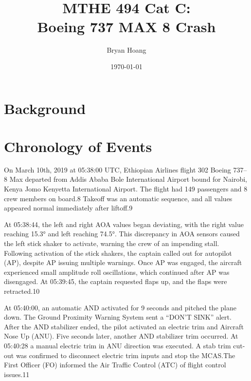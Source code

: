 \documentclass[
  10pt,
  promotesection,
  endnotes,
  draft,
]{memreport}
\title{
  MTHE 494 Cat C:\\
  Boeing 737 MAX 8 Crash
}
\author{Bryan Hoang}
\date{\today}
\begin{document}
  \begin{titlingpage}
    \maketitle
  \end{titlingpage}

  \mainmatter{}


  \section{Background}

  \autocite{noauthor_aircraft_2019}

  \section{Chronology of Events}

  On March 10th, 2019 at 05:38:00 UTC, Ethiopian Airlines flight 302 Boeing 737--8 Max departed from Addis Ababa Bole International Airport bound for Nairobi, Kenya Jomo Kenyetta International Airport. The flight had 149 passengers and 8 crew members on board.8 Takeoff was an automatic sequence, and all values appeared normal immediately after liftoff.9

  At 05:38:44, the left and right AOA values began deviating, with the right value reaching 15.3° and left reaching 74.5°. This discrepancy in AOA sensors caused the left stick shaker to activate, warning the crew of an impending stall. Following activation of the stick shakers, the captain called out for autopilot (AP), despite AP issuing multiple warnings. Once AP was engaged, the aircraft experienced small amplitude roll oscillations, which continued after AP was disengaged. At 05:39:45, the captain requested flaps up, and the flaps were retracted.10

  At 05:40:00, an automatic AND activated for 9 seconds and pitched the plane down. The Ground Proximity Warning System sent a ``DON'T SINK'' alert. After the AND stabilizer ended, the pilot activated an electric trim and Aircraft Nose Up (ANU). Five seconds later, another AND stabilizer trim occurred. At 05:40:28 a manual electric trim in ANU direction was executed. A stab trim cut-out was confirmed to disconnect electric trim inputs and stop the MCAS.\@ The First Officer (FO) informed the Air Traffic Control (ATC) of flight control issues.11
\end{document}
